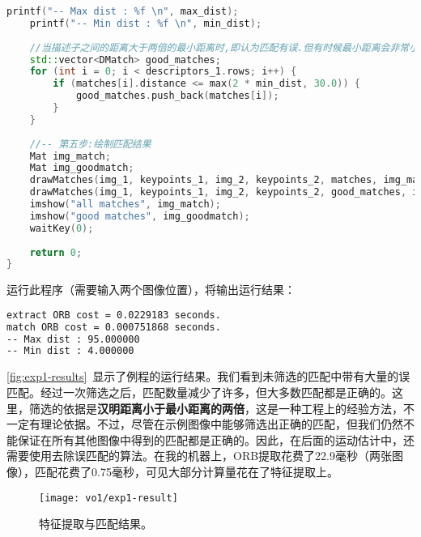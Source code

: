 \begin{lstlisting}[language=c++,caption=slambook2/ch7/orb_cv.cpp]
    printf("-- Max dist : %f \n", max_dist);
    printf("-- Min dist : %f \n", min_dist);
    
    //当描述子之间的距离大于两倍的最小距离时,即认为匹配有误.但有时候最小距离会非常小,设置一个经验值30作为下限.
    std::vector<DMatch> good_matches;
    for (int i = 0; i < descriptors_1.rows; i++) {
        if (matches[i].distance <= max(2 * min_dist, 30.0)) {
            good_matches.push_back(matches[i]);
        }
    }
    
    //-- 第五步:绘制匹配结果
    Mat img_match;
    Mat img_goodmatch;
    drawMatches(img_1, keypoints_1, img_2, keypoints_2, matches, img_match);
    drawMatches(img_1, keypoints_1, img_2, keypoints_2, good_matches, img_goodmatch);
    imshow("all matches", img_match);
    imshow("good matches", img_goodmatch);
    waitKey(0);
    
    return 0;
}
\end{lstlisting}

运行此程序（需要输入两个图像位置），将输出运行结果：
\begin{lstlisting}[language=sh,caption=终端输入：]
% build/orb_cv 1.png 2.png
extract ORB cost = 0.0229183 seconds. 
match ORB cost = 0.000751868 seconds.
-- Max dist : 95.000000 
-- Min dist : 4.000000 
\end{lstlisting}

\autoref{fig:exp1-results}~显示了例程的运行结果。我们看到未筛选的匹配中带有大量的误匹配。经过一次筛选之后，匹配数量减少了许多，但大多数匹配都是正确的。这里，筛选的依据是\textbf{汉明距离小于最小距离的两倍}，这是一种工程上的经验方法，不一定有理论依据。不过，尽管在示例图像中能够筛选出正确的匹配，但我们仍然不能保证在所有其他图像中得到的匹配都是正确的。因此，在后面的运动估计中，还需要使用去除误匹配的算法。在我的机器上，ORB提取花费了22.9毫秒（两张图像），匹配花费了0.75毫秒，可见大部分计算量花在了特征提取上。

\begin{figure}[!htp]
	\centering
	\texttt{[image: vo1/exp1-result]}
	\caption{特征提取与匹配结果。}
	\label{fig:exp1-results} 
\end{figure}

